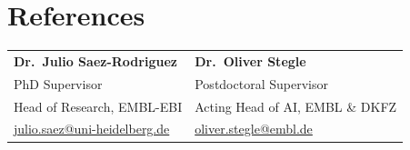 \documentclass[11pt,a4paper]{article}
\begin{document}
\section{References}

\begin{tabularx}{\textwidth}{@{}XX@{}}
\textbf{Dr.\ Julio Saez-Rodriguez} & \textbf{Dr.\ Oliver Stegle}\\
PhD Supervisor & Postdoctoral Supervisor\\
Head of Research, EMBL-EBI & Acting Head of AI, EMBL \& DKFZ\\
\href{mailto:julio.saez@uni-heidelberg.de}{julio.saez@uni-heidelberg.de} &
\href{mailto:oliver.stegle@embl.de}{oliver.stegle@embl.de}\\
\end{tabularx}
\end{document}
